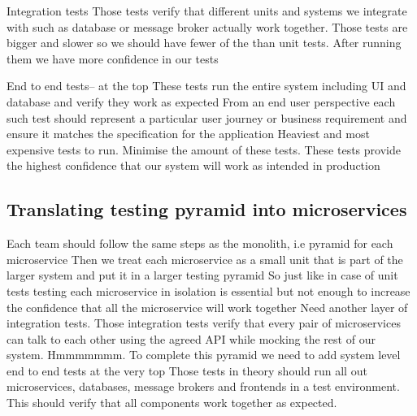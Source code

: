 \documentclass[a4paper, 11pt]{book}
\begin{document}
    Integration tests
    Those tests verify that different units and systems we integrate with such as database or message broker actually work together.
    Those tests are bigger and slower so we should have fewer of the than unit tests.
    After running them we have more confidence in our tests

    End to end tests-- at the top
    These tests run the entire system including UI and database and verify they work as expected
    From an end user perspective each such test should represent a particular user journey or business requirement and ensure it matches the specification for the application
    Heaviest and most expensive tests to run.
    Minimise the amount of these tests.
    These tests provide the highest confidence that our system will work as intended in production

    \subsection{Translating testing pyramid into microservices}
    Each team should follow the same steps as the monolith, i.e pyramid for each microservice
    Then we treat each microservice as a small unit that is part of the larger system and put it in a larger testing pyramid
    So just like in case of unit tests testing each microservice in isolation is essential but not enough to increase the confidence that all the microservice will work together
    Need another layer of integration tests.
    Those integration tests verify that every pair of microservices can talk to each other using the agreed API while mocking the rest of our system. Hmmmmmmm.
    To complete this pyramid we need to add system level end to end tests at the very top
    Those tests in theory should run all out microservices, databases, message brokers and frontends in a test environment.
    This should verify that all components work together as expected.
\end{document}

